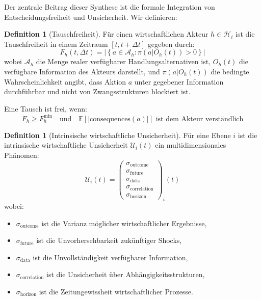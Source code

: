 \documentclass[a4paper, 12pt, twoside, openright]{report}
\theoremstyle{definition}
\newtheorem{definition}[theorem]{Definition}
\theoremstyle{definition}
\begin{document}
Der zentrale Beitrag dieser Synthese ist die formale Integration von Entscheidungsfreiheit und Unsicherheit. Wir definieren:

\begin{definition}[Tauschfreiheit]
\label{def:tauschfreiheit}
Für einen wirtschaftlichen Akteur $h \in \mathcal{H}_i$ ist die Tauschfreiheit in einem Zeitraum $[t, t+\Delta t]$ gegeben durch:
\begin{equation}
F_h(t, \Delta t) = \left| \left\{ a \in \mathcal{A}_h : \pi(a|O_h(t)) > 0 \right\} \right|
\end{equation}
wobei $\mathcal{A}_h$ die Menge realer verfügbarer Handlungsalternativen ist, $O_h(t)$ die verfügbare Information des Akteurs darstellt, und $\pi(a|O_h(t))$ die bedingte Wahrscheinlichkeit angibt, dass Aktion $a$ unter gegebener Information durchführbar und nicht von Zwangsstrukturen blockiert ist.

Eine Tausch ist frei, wenn:
\begin{equation}
F_h \geq F_h^{\min} \quad \text{und} \quad \mathbb{E}[|\text{consequences}(a)|] \text{ ist dem Akteur verständlich}
\end{equation}
\end{definition}

\begin{definition}[Intrinsische wirtschaftliche Unsicherheit]
\label{def:unsicherheit-integral}
Für eine Ebene $i$ ist die intrinsische wirtschaftliche Unsicherheit $\mathcal{U}_i(t)$ ein multidimensionales Phänomen:
\begin{equation}
\mathcal{U}_i(t) = \left(
\begin{array}{c}
\sigma_{\text{outcome}} \\
\sigma_{\text{future}} \\
\sigma_{\text{data}} \\
\sigma_{\text{correlation}} \\
\sigma_{\text{horizon}}
\end{array}
\right)_i(t)
\end{equation}
wobei:
\begin{itemize}
\item $\sigma_{\text{outcome}}$ ist die Varianz möglicher wirtschaftlicher Ergebnisse,
\item $\sigma_{\text{future}}$ ist die Unvorhersehbarkeit zukünftiger Shocks,
\item $\sigma_{\text{data}}$ ist die Unvollständigkeit verfügbarer Information,
\item $\sigma_{\text{correlation}}$ ist die Unsicherheit über Abhängigkeitsstrukturen,
\item $\sigma_{\text{horizon}}$ ist die Zeitungewissheit wirtschaftlicher Prozesse.
\end{itemize}
\end{definition}
\end{document}

